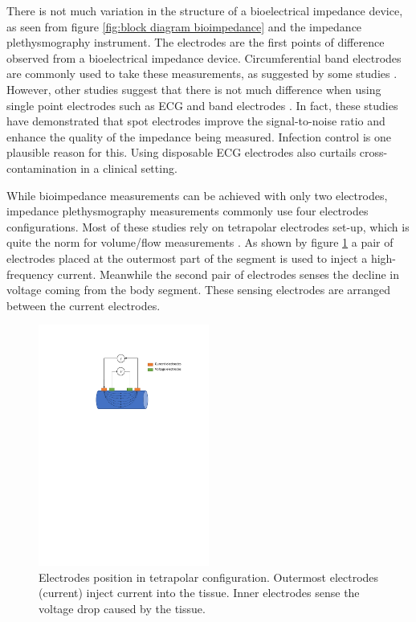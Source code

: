 There is not much variation in the structure of a bioelectrical impedance device, as seen from figure \ref{fig:block diagram bioimpedance} and the impedance plethysmography instrument. The electrodes are the first points of difference observed from a bioelectrical impedance device. Circumferential band electrodes are commonly used to take these measurements, as suggested by some studies \cite{ bera2014bioelectrical, mohapatra1979measurement, yamakoshi1980limb, porter1985measurement, corciova2011peripheral, anderson1984impedance}. However, other studies suggest that there is not much difference when using single point electrodes such as ECG and band electrodes \cite{qu1986motion, sherwood1991comparison, patterson1991impedance}. In fact, these studies have demonstrated that spot electrodes improve the signal-to-noise ratio and enhance the quality of the impedance being measured. Infection control is one plausible reason for this. Using disposable ECG electrodes also curtails cross-contamination in a clinical setting.

While bioimpedance measurements can be achieved with only two electrodes, impedance plethysmography measurements commonly use four electrodes configurations. Most of these studies rely on tetrapolar electrodes set-up, which is quite the norm for volume/flow measurements \cite{nyboer1974blood, costeloe1980continuous, yamakoshi1980limb, yamamoto1992impedance}. As shown by figure \ref{fig:tetrapolar iPG} a pair of electrodes placed at the outermost part of the segment is used to inject a high-frequency current. Meanwhile the second pair of electrodes senses the decline in voltage coming from the body segment. These sensing electrodes are arranged between the current electrodes. 

\begin{figure}[!htpb]
	\centering
	\includegraphics[width=0.5\textwidth,keepaspectratio]{tetrapolar_impedance}    
	\caption[Electrodes position in tetrapolar configuration]{Electrodes position in tetrapolar configuration. Outermost electrodes (current) inject current into the tissue. Inner electrodes sense the voltage drop caused by the tissue.}
	\label{fig:tetrapolar iPG}
\end{figure}


